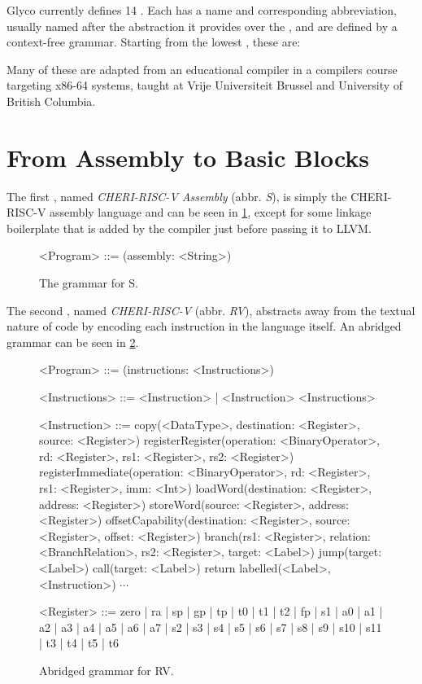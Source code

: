 \documentclass[main.tex]{subfiles}
\begin{document}
Glyco currently defines 14 \ils{}. Each \il{} has a name and corresponding abbreviation, usually named after the abstraction it provides over the \lowerlang{}, and are defined by a context-free grammar. Starting from the lowest \il{}, these are:


Many of these \ils{} are adapted from an educational compiler in a compilers course targeting x86-64 systems, taught at Vrije Universiteit Brussel \cite{:compcourse} and University of British Columbia.

\section{From Assembly to Basic Blocks}

The first \il{}, named \emph{CHERI-RISC-V Assembly} (abbr. \emph{S}), is simply the CHERI-RISC-V assembly language and can be seen in \cref{bnf:s}, except for some linkage boilerplate that is added by the compiler just before passing it to LLVM.

\begin{figure}[ht]
	\begin{grammar}
		<Program> ::= (assembly: <String>)
	\end{grammar}
	\caption{The grammar for S.}
	\label{bnf:s}
\end{figure}

The second \il{}, named \emph{CHERI-RISC-V} (abbr. \emph{RV}), abstracts away from the textual nature of code by encoding each instruction in the language itself. An abridged grammar can be seen in \cref{bnf:rv}.

\begin{figure}[ht]
	\begin{grammar}
		
		<Program> ::= (instructions: <Instructions>)
		
		<Instructions> ::= <Instruction> | <Instruction> <Instructions>
		
		<Instruction> ::= copy(<DataType>, destination: <Register>, source: <Register>)
			\alt registerRegister(operation: <BinaryOperator>, rd: <Register>, rs1: <Register>, rs2: <Register>)
			\alt registerImmediate(operation: <BinaryOperator>, rd: <Register>, rs1: <Register>, imm: <Int>)
			\alt loadWord(destination: <Register>, address: <Register>)
			\alt storeWord(source: <Register>, address: <Register>)
			\alt offsetCapability(destination: <Register>, source: <Register>, offset: <Register>)
			\alt branch(rs1: <Register>, relation: <BranchRelation>, rs2: <Register>, target: <Label>)
			\alt jump(target: <Label>)
			\alt call(target: <Label>)
			\alt return
			\alt labelled(<Label>, <Instruction>)
			\alt $\cdots$
			
		<Register> ::= zero | ra | sp | gp | tp | t0 | t1 | t2 | fp | s1 | a0 | a1 | a2 | a3 | a4 | a5 | a6 | a7 | s2 | s3 | s4 | s5 | s6 | s7 | s8 | s9 | s10 | s11 | t3 | t4 | t5 | t6
		
	\end{grammar}
	\caption{Abridged grammar for RV.}
	\label{bnf:rv}
\end{figure}
\end{document}
